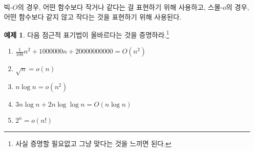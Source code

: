 \documentclass[b5paper, 11pt]{book}
\theoremstyle{definition}
\newtheorem{ex}[defn]{예제}
\begin{document}
빅-$O$의 경우, 어떤 함수보다 작거나 같다는 걸 표현하기 위해 사용하고, 스몰-$o$의 경우, 어떤 함수보다 같지 않고 작다는 것을 표현하기 위해 사용된다. 
\begin{ex}
    다음 점근적 표기법이 올바르다는 것을 증명하라.\footnote{사실 증명할 필요없고 그냥 맞다는 것을 느끼면 된다.}
    \begin{enumerate}
        \item $\frac{1}{100}n^2 + 1000000n + 20000000000 = O(n^2)$
        \item $\sqrt{n} = o(n)$
        \item $n\log{n} = o(n^2)$
        \item $3n\log{n} + 2n\log{\log{n}} = O(n\log{n})$
        \item $2^n = o(n!)$ 
    \end{enumerate}
\end{ex}
\end{document}
